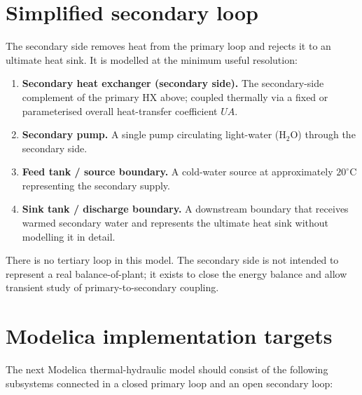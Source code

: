 \documentclass[11pt]{article}
\begin{document}
\section{Simplified secondary loop}

The secondary side removes heat from the primary loop and rejects it to
an ultimate heat sink.  It is modelled at the minimum useful resolution:

\begin{enumerate}
  \item \textbf{Secondary heat exchanger (secondary side).}  The
        secondary-side complement of the primary HX above; coupled
        thermally via a fixed or parameterised overall heat-transfer
        coefficient $UA$.
  \item \textbf{Secondary pump.}  A single pump circulating light-water
        ($\mathrm{H_2O}$) through the secondary side.
  \item \textbf{Feed tank / source boundary.}  A cold-water source at
        approximately $20^{\circ}\mathrm{C}$ representing the secondary
        supply.
  \item \textbf{Sink tank / discharge boundary.}  A downstream boundary
        that receives warmed secondary water and represents the ultimate
        heat sink without modelling it in detail.
\end{enumerate}

There is no tertiary loop in this model.  The secondary side is not
intended to represent a real balance-of-plant; it exists to close the
energy balance and allow transient study of primary-to-secondary
coupling.

\section{Modelica implementation targets}

The next Modelica thermal-hydraulic model should consist of the following
subsystems connected in a closed primary loop and an open secondary loop:
\end{document}
